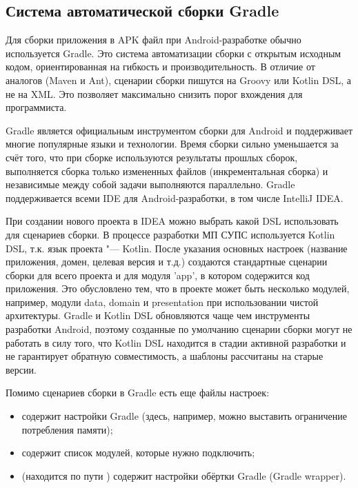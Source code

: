 \subsection{Система автоматической сборки Gradle}
\label{subsec:gradle}

Для сборки приложения в APK файл при Android-разработке обычно используется Gradle.
Это система автоматизации сборки с открытым исходным кодом, ориентированная на гибкость и производительность.
В отличие от аналогов (Maven и Ant), сценарии сборки пишутся на Groovy или Kotlin DSL, а не на XML\@.
Это позволяет максимально снизить порог вхождения для программиста.

Gradle является официальным инструментом сборки для Android и поддерживает многие популярные языки и технологии.
Время сборки сильно уменьшается за счёт того, что при сборке используются результаты прошлых сборок, выполняется сборка только измененных файлов (инкрементальная сборка) и независимые между собой задачи выполняются параллельно.
Gradle поддерживается всеми IDE для Android-разработки, в том числе IntelliJ IDEA\@.

При создании нового проекта в IDEA можно выбрать какой DSL использовать для сценариев сборки.
В процессе разработки МП СУПС используется Kotlin DSL, т.к. язык проекта "--- Kotlin.
После указания основных настроек (название приложения, домен, целевая версия и т.д.) создаются стандартные сценарии сборки для всего проекта и для модуля 'app', в котором содержится код приложения.
Это обусловлено тем, что в проекте может быть несколько модулей, например, модули data, domain и presentation при использовании чистой архитектуры.
Gradle и Kotlin DSL обновляются чаще чем инструменты разработки Android, поэтому созданные по умолчанию сценарии сборки могут не работать в силу того, что Kotlin DSL находится в стадии активной разработки и не гарантирует обратную совместимость, а шаблоны рассчитаны на старые версии.

Помимо сценариев сборки в Gradle есть еще файлы настроек:
\begin{itemize}
  \item {} содержит настройки Gradle (здесь, например, можно выставить ограничение потребления памяти);
  \item {} содержит список модулей, которые нужно подключить;
  \item {} (находится по пути ) содержит настройки обёртки Gradle (Gradle wrapper).
\end{itemize}

